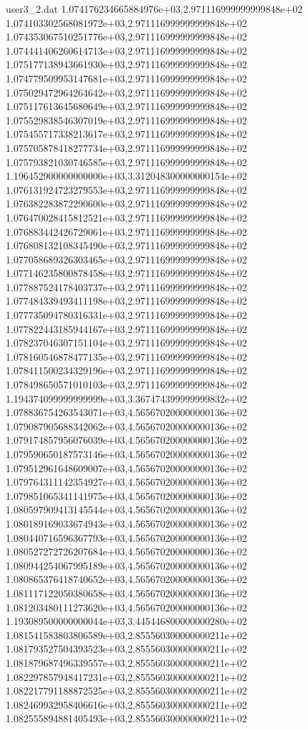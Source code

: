 \begin{filecontents}{user3_2.dat}
1.074176234665884976e+03,2.971116999999999848e+02
1.074103302568081972e+03,2.971116999999999848e+02
1.074353067510251776e+03,2.971116999999999848e+02
1.074441406260614713e+03,2.971116999999999848e+02
1.075177138943661930e+03,2.971116999999999848e+02
1.074779509953147681e+03,2.971116999999999848e+02
1.075029472964264642e+03,2.971116999999999848e+02
1.075117613645680649e+03,2.971116999999999848e+02
1.075529838546307019e+03,2.971116999999999848e+02
1.075455717338213617e+03,2.971116999999999848e+02
1.075705878418277734e+03,2.971116999999999848e+02
1.075793821030746585e+03,2.971116999999999848e+02
1.196452900000000000e+03,3.312048300000000154e+02
1.076131924723279553e+03,2.971116999999999848e+02
1.076382283872290600e+03,2.971116999999999848e+02
1.076470028415812521e+03,2.971116999999999848e+02
1.076883442426729061e+03,2.971116999999999848e+02
1.076808132108345490e+03,2.971116999999999848e+02
1.077058689326303465e+03,2.971116999999999848e+02
1.077146235800878458e+03,2.971116999999999848e+02
1.077887524178403737e+03,2.971116999999999848e+02
1.077484339493411198e+03,2.971116999999999848e+02
1.077735094780316331e+03,2.971116999999999848e+02
1.077822443185944167e+03,2.971116999999999848e+02
1.078237046307151104e+03,2.971116999999999848e+02
1.078160546878477135e+03,2.971116999999999848e+02
1.078411500234329196e+03,2.971116999999999848e+02
1.078498650571010103e+03,2.971116999999999848e+02
1.194374099999999999e+03,3.367474399999999832e+02
1.078836754263543071e+03,4.565670200000000136e+02
1.079087905688342062e+03,4.565670200000000136e+02
1.079174857956076039e+03,4.565670200000000136e+02
1.079590650187573146e+03,4.565670200000000136e+02
1.079512961648609007e+03,4.565670200000000136e+02
1.079764311142354927e+03,4.565670200000000136e+02
1.079851065341141975e+03,4.565670200000000136e+02
1.080597909413145544e+03,4.565670200000000136e+02
1.080189169033674943e+03,4.565670200000000136e+02
1.080440716596367793e+03,4.565670200000000136e+02
1.080527272726207684e+03,4.565670200000000136e+02
1.080944254067995189e+03,4.565670200000000136e+02
1.080865376418740652e+03,4.565670200000000136e+02
1.081117122050380658e+03,4.565670200000000136e+02
1.081203480111273620e+03,4.565670200000000136e+02
1.193089500000000044e+03,3.445446800000000280e+02
1.081541583803806589e+03,2.855560300000000211e+02
1.081793527504393523e+03,2.855560300000000211e+02
1.081879687496339557e+03,2.855560300000000211e+02
1.082297857948417231e+03,2.855560300000000211e+02
1.082217791188872525e+03,2.855560300000000211e+02
1.082469932958406616e+03,2.855560300000000211e+02
1.082555894881405493e+03,2.855560300000000211e+02

\end{filecontents}
